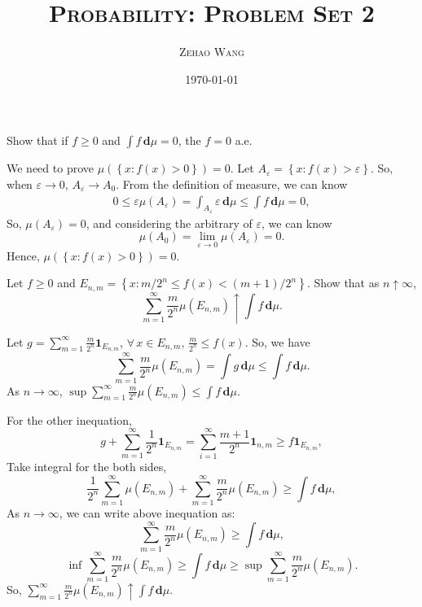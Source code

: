 \documentclass[en, normal, 11pt, black]{elegantnote}
\title{\textsc{Probability: Problem Set 2}}
\author{\textsc{Zehao Wang}}
\date{\today}
\newenvironment{exercise}[1]{\begin{tcolorbox}[colback=black!15, colframe=black!80, breakable, title=#1]}{\end{tcolorbox}}
\renewenvironment{proof}{\begin{tcolorbox}[colback=white, colframe=black!50, breakable, title=Proof. ]\setlength{\parskip}{0.8em}}{\\\rightline{$\square$}\end{tcolorbox}}
\newcommand{\der}{\,\mathbf{d}}
\begin{document}
\maketitle
    \begin{exercise}{1.4.1}
        Show that if $f\geqslant0$ and $\int f\der \mu=0$, the $f=0$ a.e. 
    \end{exercise}

    \begin{proof}
        We need to prove $\mu\left(\left\{x:f(x)>0\right\}\right)=0$. Let $A_\varepsilon=\left\{x:f(x)>\varepsilon\right\}$. So, when $\varepsilon\to0$, $A_\varepsilon\to A_0$. 
        From the definition of measure, we can know
        \begin{align*}
            0\leqslant\varepsilon\mu(A_\varepsilon)=\int_{A_\varepsilon}\varepsilon\der\mu\leqslant\int f\der\mu=0, 
        \end{align*}
        So, $\mu(A_\varepsilon)=0$, and considering the arbitrary of $\varepsilon$, we can know
        \[\mu(A_0)=\lim_{\varepsilon\to0}\mu(A_\varepsilon)=0. \]
        Hence,  $\mu\left(\left\{x:f(x)>0\right\}\right)=0$. 
    \end{proof}


    \begin{exercise}{1.4.2}
        Let $f \geq 0$ and $E_{n, m}=\left\{x: m / 2^{n} \leqslant f(x)<(m+1) / 2^{n}\right\}$. Show that as $n \uparrow \infty$, 
        \[
            \sum_{m=1}^{\infty} \frac{m}{2^{n}} \mu\left(E_{n, m}\right) \uparrow \int f \der \mu. 
        \]
    \end{exercise}

    \begin{proof}
        Let $g=\sum_{m=1}^\infty\frac{m}{2^n}\mathbf{1}_{E_{n,m}}$, $\forall\,x\in E_{n,m}$, $\frac{m}{2^n}\leqslant f(x)$. So, we have 
        \[
            \sum_{m=1}^\infty\frac{m}{2^n}\mu(E_{n,m})=\int g\der \mu\leqslant\int f\der \mu. 
        \]
        As $n\to\infty$, $\sup \sum_{m=1}^\infty\frac{m}{2^n}\mu(E_{n,m})\leqslant \int f\der \mu$. 

        For the other inequation, 
        \[
            g+\sum_{m=1}^\infty \frac{1}{2^n}\mathbf{1}_{E_{n,m}}=\sum_{i=1}^\infty\frac{m+1}{2^n}\mathbf{1}_{n,m}\geqslant f\mathbf{1}_{E_{n,m}}, 
        \]
        Take integral for the both sides, 
        \[
            \frac{1}{2^n}\sum_{m=1}^\infty\mu(E_{n,m})+\sum_{m=1}^\infty\frac{m}{2^n}\mu(E_{n,m})\geqslant\int f\der\mu, 
        \]
        As $n\to \infty$, we can write above inequation as: 
        \[
            \sum_{m=1}^\infty\frac{m}{2^n}\mu(E_{n,m})\geqslant\int f\der\mu, 
        \]
        \[
            \inf \sum_{m=1}^\infty\frac{m}{2^n}\mu(E_{n,m})\geqslant\int f\der\mu\geqslant\sup \sum_{m=1}^\infty\frac{m}{2^n}\mu(E_{n,m}). 
        \]
        So, $\sum_{m=1}^{\infty} \frac{m}{2^{n}} \mu\left(E_{n, m}\right) \uparrow \int f \der \mu$. 
    \end{proof}
\end{document}
